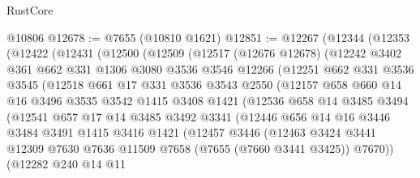 \begin{lexlean}{RustCore}
\begin{coremodule}
    @10806
@12678 := @7655 (@10810 @1621)
@12851 := @12267
    (@12344
      (@12353
        (@12422
          (@12431
            (@12500
              (@12509
                (@12517
                  (@12676 @12678)
                  (@12242
                    @3402
                    @361
                    @662
                    @331
                    @1306
                    @3080
                    @3536
                    @3546
                    @12266
                    (@12251
                      @662
                      @331
                      @3536
                      @3545
                      (@12518
                        @661
                        @17
                        @331
                        @3536
                        @3543
                        @2550
                        (@12157
                          @658
                          @660
                          @14
                          @16
                          @3496
                          @3535
                          @3542
                          @1415
                          @3408
                          @1421
                          (@12536
                            @658
                            @14
                            @3485
                            @3494
                            (@12541
                              @657
                              @17
                              @14
                              @3485
                              @3492
                              @3341
                              (@12446
                                @656
                                @14
                                @16
                                @3446
                                @3484
                                @3491
                                @1415
                                @3416
                                @1421
                                (@12457
                                  @3446
                                  (@12463
                                    @3424
                                    @3441
                                    @12309
                                    @7630
                                    @7636
                                    @11509
                                    @7658
                                    (@7655 (@7660 @3441 @3425))
                                    @7670))
                                (@12282
                                  @240
                                  @14
                                  @11

\end{coremodule}
\end{lexlean}
